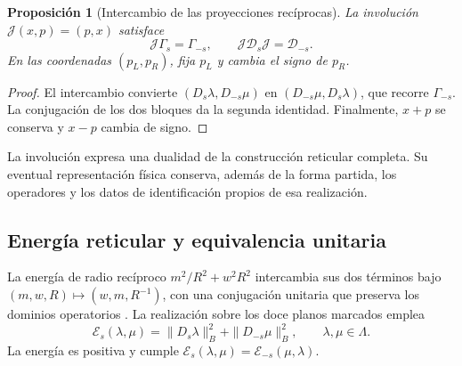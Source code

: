 \documentclass[a4paper,10pt]{article}
\newtheorem{proposition}[theorem]{Proposición}
\theoremstyle{definition}\newtheorem{definition}[theorem]{Definición}
\theoremstyle{remark}\newtheorem{remark}[theorem]{Observación}
\numberwithin{equation}{section}
\begin{document}
\begin{proposition}[Intercambio de las proyecciones recíprocas]
\label{prop:leech-split-involution}
La involución \(\mathcal J(x,p)=(p,x)\) satisface
\[
 \mathcal J\Gamma_s=\Gamma_{-s},\qquad
 \mathcal J\mathcal D_s\mathcal J=\mathcal D_{-s}.
\]
En las coordenadas \((p_L,p_R)\), fija \(p_L\) y cambia el signo
de \(p_R\).
\end{proposition}
\begin{proof}
El intercambio convierte
\((D_s\lambda,D_{-s}\mu)\) en
\((D_{-s}\mu,D_s\lambda)\), que recorre \(\Gamma_{-s}\).
La conjugación de los dos bloques da la segunda identidad.
Finalmente, \(x+p\) se conserva y \(x-p\) cambia de signo.
\end{proof}

La involución expresa una dualidad de la construcción reticular
completa. Su eventual representación física conserva, además de
la forma partida, los operadores y los datos de identificación
propios de esa realización.

\subsection{Energía reticular y equivalencia unitaria}
\label{subsec:leech-energy}

La energía de radio recíproco
\(m^2/R^2+w^2R^2\) intercambia sus dos términos bajo
\((m,w,R)\mapsto(w,m,R^{-1})\), con una conjugación unitaria
que preserva los dominios operatorios \cite{HMT-IV}.
La realización sobre los doce planos marcados emplea
\begin{equation}
 \mathcal E_s(\lambda,\mu)=
       \|D_s\lambda\|_B^2+\|D_{-s}\mu\|_B^2,
 \qquad \lambda,\mu\in\Lambda.
 \label{eq:leech-energy}
\end{equation}
La energía es positiva y cumple
\(\mathcal E_s(\lambda,\mu)=\mathcal E_{-s}(\mu,\lambda)\).
\end{document}

